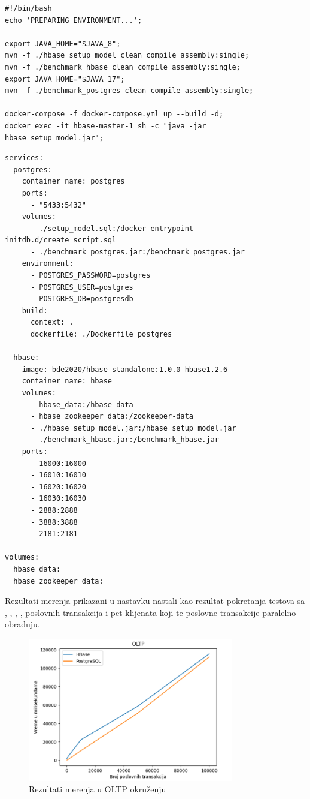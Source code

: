 \documentclass[12pt,oneside]{memoir}
\begin{document}
\pagebreak

\begin{lstlisting}[title={prepare-env.sh},captionpos=t]
#!/bin/bash
echo 'PREPARING ENVIRONMENT...';

export JAVA_HOME="$JAVA_8";
mvn -f ./hbase_setup_model clean compile assembly:single;
mvn -f ./benchmark_hbase clean compile assembly:single;
export JAVA_HOME="$JAVA_17";
mvn -f ./benchmark_postgres clean compile assembly:single;

docker-compose -f docker-compose.yml up --build -d;
docker exec -it hbase-master-1 sh -c "java -jar hbase_setup_model.jar";
\end{lstlisting}

\begin{lstlisting}[title={docker-compose.yml},captionpos=t]
services: 
  postgres:
    container_name: postgres
    ports:
      - "5433:5432"
    volumes:
      - ./setup_model.sql:/docker-entrypoint-initdb.d/create_script.sql
      - ./benchmark_postgres.jar:/benchmark_postgres.jar
    environment:
      - POSTGRES_PASSWORD=postgres
      - POSTGRES_USER=postgres
      - POSTGRES_DB=postgresdb
    build:
      context: .
      dockerfile: ./Dockerfile_postgres

  hbase:
    image: bde2020/hbase-standalone:1.0.0-hbase1.2.6
    container_name: hbase
    volumes:
      - hbase_data:/hbase-data
      - hbase_zookeeper_data:/zookeeper-data
      - ./hbase_setup_model.jar:/hbase_setup_model.jar
      - ./benchmark_hbase.jar:/benchmark_hbase.jar
    ports:
      - 16000:16000
      - 16010:16010
      - 16020:16020
      - 16030:16030
      - 2888:2888
      - 3888:3888
      - 2181:2181

volumes:
  hbase_data:
  hbase_zookeeper_data:
\end{lstlisting}

Rezultati merenja prikazani u nastavku nastali kao rezultat pokretanja testova sa , , , ,  poslovnih transakcija i pet klijenata koji te poslovne transakcije paralelno obrađuju.

\begin{figure}[!ht]
  \centering
  \includegraphics[width=0.8\textwidth]{oltp-vizualization.png}
  \caption{Rezultati merenja u OLTP okruženju}
  \label{fig:grafikon}
\end{figure}
\end{document}
